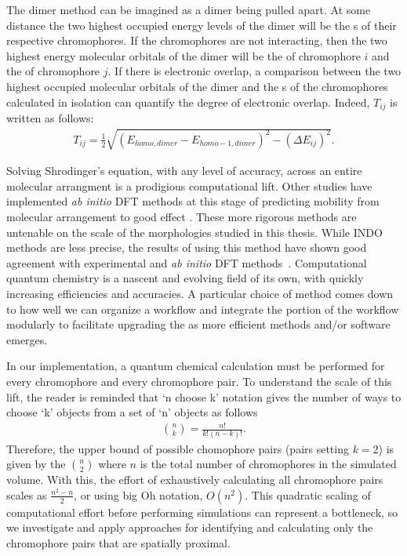 The dimer method can be imagined as a dimer being pulled apart. At some distance
the two highest occupied energy levels of the dimer will 
be the s of their respective chromophores. 
If the chromophores are not interacting, 
then the two highest energy molecular orbitals of the dimer will be the  of chromophore $i$ and the 
 of chromophore $j$. If there is electronic overlap, a
comparison between the two highest occupied
molecular orbitals of the dimer and the s of the chromophores calculated in isolation can quantify the degree of
electronic overlap. Indeed, $T_{ij}$ is written as follows:
\begin{align}
    T_{ij} = \frac{1}{2}\sqrt{ (E_{homo,dimer} - E_{homo-1,dimer})^{2} - (\Delta E_{ij})^{2} }.
\end{align}
 
Solving Shrodinger's equation, with any level of accuracy,
across an entire molecular arrangment is a prodigious computational lift.
Other studies have implemented \textit{ab initio} DFT methods at this stage of predicting
mobility from molecular arrangement to good effect \cite{Deng2004}. These more
rigorous methods are
untenable on the scale of the morphologies studied in this thesis. While INDO methods are less precise, 
the results of using this method have shown good agreement with experimental and \textit{ab initio}
DFT methods~\cite{Bredas2002}. 
Computational quantum chemistry is a nascent and evolving field of its
own, with quickly increasing efficiencies and accuracies.
A particular 
choice of method comes down to how well we can organize a workflow and integrate the  portion of the
workflow modularly to facilitate upgrading the  as more
efficient methods and/or software emerges.

In our implementation, a quantum chemical calculation must be performed for every chromophore and every chromophore pair. 
To understand the scale of this lift, the reader is reminded that
`n choose k' notation gives the number of ways to choose `k' objects from a set of 
`n' objects as follows 
\begin{align}
    {n \choose k} =  \frac{n!}{k!(n-k)!}.
\end{align}
Therefore, the upper bound of possible chomophore pairs (pairs setting $k=2$) is given by the 
$n \choose 2$ where $n$ is the total number of chromophores in the simulated volume. 
With this, the effort of exhaustively calculating all chromophore pairs scales as $\frac{n^{2} - n}{2}$, or using big Oh notation, $O(n^2)$.
This quadratic scaling of computational effort before performing  
simulations can represent a bottleneck, so
we investigate and apply approaches for identifying and calculating only the chromophore pairs that are
spatially proximal.

